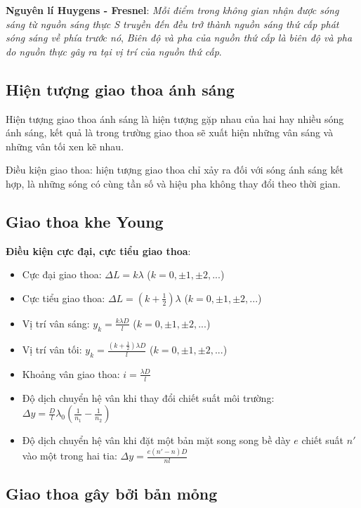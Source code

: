 \documentclass[12pt,a4paper]{article}
\begin{document}
\textbf{Nguyên lí Huygens - Fresnel}: \textit{Mỗi điểm trong không gian nhận được sóng sáng từ nguồn sáng thực S truyền đến
đều trở thành nguồn sáng thứ cấp phát sóng sáng về phía trước nó}, \textit{Biên độ và pha của nguồn thứ cấp là biên độ và pha do nguồn thực gây ra tại vị trí
của nguồn thứ cấp}.

\subsection*{Hiện tượng giao thoa ánh sáng}

Hiện tượng giao thoa ánh sáng là hiện tượng gặp nhau của hai hay nhiều sóng
ánh sáng, kết quả là trong trường giao thoa sẽ xuất hiện những vân sáng và những vân tối xen
kẽ nhau.

Điều kiện giao thoa: hiện tượng giao thoa chỉ xảy ra đối với sóng ánh sáng kết hợp, là
những sóng có cùng tần số và hiệu pha không thay đổi theo thời gian.

\subsection*{Giao thoa khe Young}

\textbf{Điều kiện cực đại, cực tiểu giao thoa}:
\begin{itemize}
    \item Cực đại giao thoa: $\Delta L = k \lambda$ ($k = 0, \pm 1, \pm 2, ...$)
    \item Cực tiểu giao thoa: $\Delta L = \left(k + \frac{1}{2}\right) \lambda$ ($k = 0, \pm 1, \pm 2, ...$)
    \item Vị trí vân sáng: $y_k = \frac{k \lambda D}{l}$ ($k = 0, \pm 1, \pm 2, ...$)
    \item Vị trí vân tối: $y_k = \frac{\left(k + \frac{1}{2}\right) \lambda D}{l}$ ($k = 0, \pm 1, \pm 2, ...$)
    \item Khoảng vân giao thoa: $i = \frac{\lambda D}{l}$
    \item Độ dịch chuyển hệ vân khi thay đổi chiết suất môi trường: $\Delta y = \frac{D}{l} \lambda_0 \left( \frac{1}{n_1} - \frac{1}{n_2} \right)$
    \item Độ dịch chuyển hệ vân khi đặt một bản mặt song song bề dày $e$ chiết suất $n'$ vào một trong hai tia: $\Delta y = \frac{e (n' - n) D}{nl}$
\end{itemize}

\subsection*{Giao thoa gây bởi bản mỏng}
\end{document}
